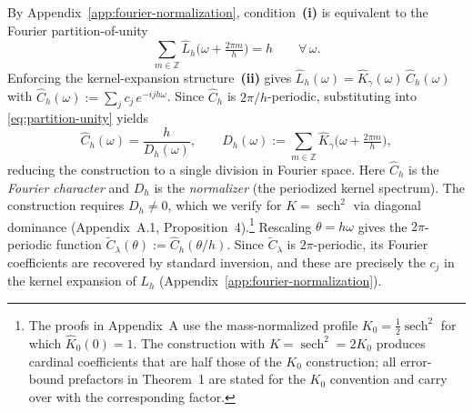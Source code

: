 \documentclass{article}
\begin{document}
By Appendix~\ref{app:fourier-normalization}, condition~\textbf{(i)} is equivalent to the Fourier partition-of-unity
\begin{equation}
  \sum_{m\in\mathbb{Z}} \widehat{L}_h\!\Big(\omega + \tfrac{2\pi m}{h}\Big) = h
  \qquad \forall\,\omega.
  \label{eq:partition-unity}
\end{equation}
Enforcing the kernel-expansion structure~\textbf{(ii)} gives \(\widehat{L}_h(\omega) = \widehat{K}_\gamma(\omega)\,\widehat{C}_h(\omega)\) with \(\widehat{C}_h(\omega) := \sum_j c_j\,e^{-ijh\omega}\).  Since \(\widehat{C}_h\) is \(2\pi/h\)-periodic, substituting into \eqref{eq:partition-unity} yields
\begin{equation}
  \widehat{C}_h(\omega) = \frac{h}{D_h(\omega)},
  \qquad
  D_h(\omega) := \sum_{m\in\mathbb{Z}} \widehat{K}_\gamma\!\Big(\omega + \tfrac{2\pi m}{h}\Big),
  \label{eq:fourier-character}
\end{equation}
reducing the construction to a single division in Fourier space.  Here \(\widehat{C}_h\) is the \emph{Fourier character} and \(D_h\) is the \emph{normalizer} (the periodized kernel spectrum).  The construction requires \(D_h \neq 0\), which we verify for \(K = \operatorname{sech}^2\) via diagonal dominance (Appendix~A.1, Proposition~4).\footnote{The proofs in Appendix~A use the mass-normalized profile \(K_0 = \tfrac{1}{2}\operatorname{sech}^2\) for which \(\widehat{K}_0(0)=1\).  The construction with \(K = \operatorname{sech}^2 = 2K_0\) produces cardinal coefficients that are half those of the \(K_0\) construction; all error-bound prefactors in Theorem~1 are stated for the \(K_0\) convention and carry over with the corresponding factor.}
Rescaling \(\theta = h\omega\) gives the \(2\pi\)-periodic function \(\widetilde{C}_\lambda(\theta) := \widehat{C}_h(\theta/h)\).  Since \(\widetilde{C}_\lambda\) is \(2\pi\)-periodic, its Fourier coefficients are recovered by standard inversion, and these are precisely the \(c_j\) in the kernel expansion of \(L_h\) (Appendix~\ref{app:fourier-normalization}).
\end{document}
